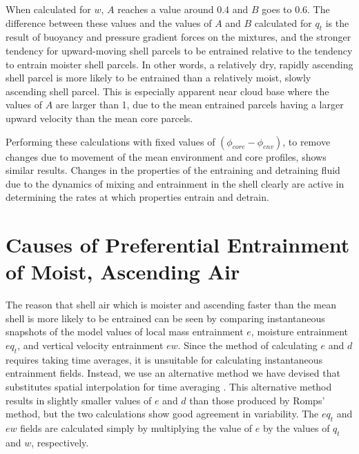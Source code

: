 \documentclass[12pt]{article}
\begin{document}
When calculated for $w$, $A$ reaches a value around 0.4 and $B$ goes to 
0.6. The difference between these values and the values of $A$ and $B$ 
calculated for $q_t$ is the result of buoyancy and pressure gradient 
forces on the mixtures, and the stronger tendency for upward-moving 
shell parcels to be entrained relative to the tendency to entrain 
moister shell parcels.  In other words, a relatively dry, rapidly 
ascending shell parcel is more likely to be entrained than a 
relatively moist, slowly ascending shell parcel. This is especially 
apparent near cloud base where the values of $A$ are larger than 1, due 
to the mean entrained parcels having a larger upward velocity than the 
mean core parcels.

Performing these calculations with fixed values of 
$(\phi_{core} - \phi_{env})$, to remove changes due to movement of the 
mean environment and core profiles, shows similar results.  Changes in 
the properties of the entraining and detraining fluid due to the 
dynamics of mixing and entrainment in the shell clearly are active in 
determining the rates at which properties entrain and detrain.


\section{Causes of Preferential Entrainment of Moist, Ascending Air}

The reason that shell air which is moister and ascending faster than the 
mean shell is more likely to be entrained can be seen by comparing 
instantaneous snapshots of the model values of local mass entrainment 
$e$, moisture entrainment $e{q_t}$, and vertical velocity entrainment 
$e{w}$.  Since the \cite{Romps2010} method of calculating $e$ and $d$ 
requires taking time averages, it is unsuitable for calculating 
instantaneous entrainment fields.  Instead, we use an alternative method 
we have devised that substitutes spatial interpolation for time averaging 
\citep{Dawe2011}.  This alternative method results in slightly smaller 
values of $e$ and $d$ than those produced by Romps' method, but the two 
calculations show good agreement in variability. The $eq_t$ and $ew$ 
fields are calculated simply by multiplying the value of $e$ by the 
values of $q_t$ and $w$, respectively.
\end{document}
